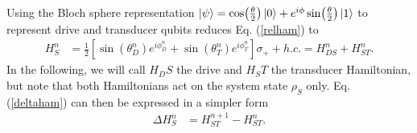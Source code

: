 Using the Bloch sphere representation $\ket{\psi} = \cos(\frac{\theta}{2}) \ket{0} + e^{i \phi} \sin(\frac{\theta}{2})\ket{1}$ to represent drive and transducer qubits reduces Eq. (\ref{relham}) to
\begin{align}
H_S^n &= \frac{1}{2} \left[\sin(\theta_D^n) e^{i\phi_D^n} + \sin(\theta_T^n) e^{i\phi_T^n}\right] \sigma_{+} + h.c. =  H_{DS}^n + H_{ST}^n. \nonumber
\end{align}
In the following, we will call $H_DS$ the drive and $H_ST$ the transducer Hamiltonian, but note that both Hamiltonians act on the system state $\rho_S$ only.
Eq. (\ref{deltaham}) can then be expressed in a simpler form
\begin{align}
\Delta H_S^n &= H_{ST}^{n+1} - H_{ST}^n. \label{simpledeltaham}
\end{align}